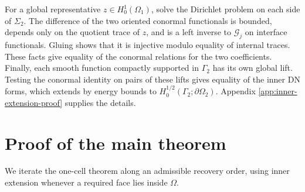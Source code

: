\documentclass[11pt,oneside]{article}
\begin{document}
For a global representative \(z\in H^1_0(\Omega_1)\), solve the Dirichlet
problem on each side of \(\Sigma_2\).  The difference of the two oriented
conormal functionals is bounded, depends only on the quotient trace of \(z\),
and is a left inverse to \(\mathcal G_j\) on interface functionals.  Gluing
shows that it is injective modulo equality of internal traces.  These facts give
equality of the conormal relations for the two coefficients.  Finally, each
smooth function compactly supported in \(\Gamma_2\) has its own global lift.
Testing the conormal identity on pairs of these lifts gives equality of the
inner DN forms, which extends by energy bounds to
\(H^{1/2}_0(\Gamma_2;\partial\Omega_2)\).  Appendix
\ref{app:inner-extension-proof} supplies the details.

\section{Proof of the main theorem}
\label{sec:global-uniqueness}

We iterate the one-cell theorem along an admissible recovery order, using
inner extension whenever a required face lies inside \(\Omega\).
\end{document}
